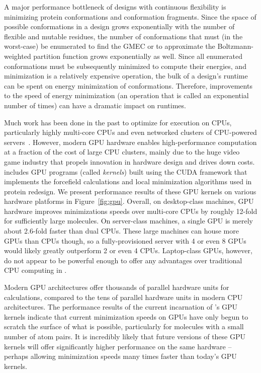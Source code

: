 A major performance bottleneck of \osprey designs with continuous flexibility is minimizing protein conformations and conformation fragments. Since the space of possible conformations in a design grows exponentially with the number of flexible and mutable residues, the number of conformations that must (in the worst-case) be enumerated to find the GMEC or to approximate the Boltzmann-weighted partition function grows exponentially as well. Since all enumerated conformations must be subsequently minimized to compute their energies, and minimization is a relatively expensive operation, the bulk of a design's runtime can be spent on energy minimization of conformations. Therefore, improvements to the speed of energy minimization (an operation that is called an exponential number of times) can have a dramatic impact on \osprey runtimes.

Much work has been done in the past to optimize \osprey for execution on CPUs, particularly highly multi-core CPUs and even networked clusters of CPU-powered servers~\cite{minBounds_DACS,cloud_OSPREY}. However, modern GPU hardware enables high-performance computation at a fraction of the cost of large CPU clusters, mainly due to the huge video game industry that propels innovation in hardware design and drives down costs.  includes GPU programs (called {\it kernels}) built using the CUDA framework that implements the forcefield calculations and local minimization algorithms used in protein redesign. We present performance results of these GPU kernels on various hardware platforms in Figure~\ref{fig:gpu}. Overall, on desktop-class machines, GPU hardware improves minimizations speeds over multi-core CPUs by roughly 12-fold for sufficiently large molecules. On server-class machines, a single GPU is merely about 2.6-fold faster than dual CPUs. These large machines can house more GPUs than CPUs though, so a fully-provisioned server with 4 or even 8 GPUs would likely greatly outperform 2 or even 4 CPUs. Laptop-class GPUs, however, do not appear to be powerful enough to offer any advantages over traditional CPU computing in .

Modern GPU architectures offer thousands of parallel hardware units for calculations, compared to the tens of parallel hardware units in modern CPU architectures. The performance results of the current incarnation of \osprey's GPU kernels indicate that current minimization speeds on GPUs have only begun to scratch the surface of what is possible, particularly for molecules with a small number of atom pairs. It is incredibly likely that future versions of these GPU kernels will offer significantly higher performance on the same hardware -- perhaps allowing minimization speeds many times faster than today's GPU kernels.

